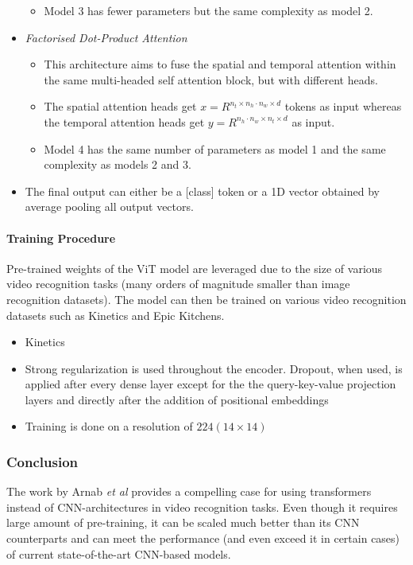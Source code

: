 \begin{itemize}
\begin{itemize}
        \item Model 3 has fewer parameters but the same complexity as model 2.
    \end{itemize}
    \item \textit{Factorised Dot-Product Attention}
    \begin{itemize}
        \item This architecture aims to fuse the spatial and temporal attention within the same multi-headed self attention block, but with different heads.
        \item The spatial attention heads get $x = R^{n_t \times n_h \cdot n_w \times d}$ tokens as input whereas the temporal attention heads get $y = R^{n_h \cdot n_w \times n_t \times d}$ as input.
        \item Model 4 has the same number of parameters as model 1 and the same complexity as models 2 and 3.
    \end{itemize}
    \item The final output can either be a [class] token or a 1D vector obtained by average pooling all output vectors.
\end{itemize}



\paragraph{Training Procedure}
\par Pre-trained weights of the ViT model are leveraged due to the size of various video recognition tasks (many orders of magnitude smaller than image recognition datasets).
The model can then be trained on various video recognition datasets such as Kinetics and Epic Kitchens.
\begin{itemize}
	\item Kinetics 
	\item Strong regularization is used throughout the encoder. Dropout, when used, is applied after every dense layer except for the the query-key-value projection layers and directly after the addition of positional embeddings
	\item Training is done on a resolution of $224 (14 \times 14)$
\end{itemize}

\subsubsection{Conclusion}
\par The work by Arnab \textit{et al} provides a compelling case for using transformers instead of CNN-architectures in video recognition tasks. 
Even though it requires large amount of pre-training, it can be scaled much better than its CNN counterparts and can meet the performance (and even exceed it in certain cases) of current state-of-the-art CNN-based models.

